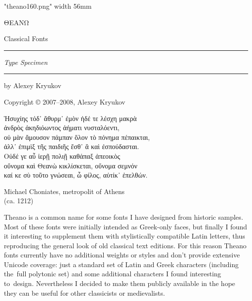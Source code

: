 \documentclass[12pt,a4paper,openany]{article}
\newcommand{\pageheader}[1]{%
	\clearpage
	\pagestyle{fancy}
	\lhead{\LARGE\bfseries#1}
	\cfoot{}
}
\begin{document}
\pagestyle{empty}
\mbox{}


\centerline{\XeTeXpicfile "theano160.png" width 56mm}


\centerline{\fontsize{48}{56}\selectfont ΘΕΑΝΩ}
\medskip

\centerline{\fontsize{48}{56}\selectfont Classical Fonts}

\bigskip

\rule{\textwidth}{0.5pt}

\bigskip

\centerline{\Large\itshape Type Specimen}

\bigskip

\rule{\textwidth}{0.5pt}


\centerline{\Large by Alexey Kryukov}


\centerline{Copyright © 2007--2008, Alexey Kryukov}

\pageheader{Theano Classical Fonts}

\epigraph{
Ἡσυχίης τόδ᾽ ἄθυρμ᾽ ἐμὸν ἠδέ τε λέσχη μακρὰ\\
ἀνδρὸς ἀκηδιόωντος ἀήματι νυσταλόεντι,\\
οὐ μὰν ἄμουσον πάμπαν ὅλον τὸ πόνημα πέπαικται,\\
ἀλλ᾽ ἐπιμὶξ τῆς παιδιῆς ἔσθ᾽ ἃ καὶ ἐσπούδασται.\\
Οὐδέ γε αὖ ἱερῇ πολιῇ καθάπαξ ἀπεοικὸς\\
οὔνομα καὶ Θεανὼ κικλίσκεται, οὔνομα σεμνόν\\
καί κε σὺ τοῦτο γνώσεαι, ὦ φίλος, αὐτίκ᾽ ἐπελθών.
}{Michael Choniates, metropolit of Athens\\ (ca. 1212)}

Theano is a common name for some fonts I have designed from historic
samples. Most of these fonts were initially intended as Greek-only
faces, but finally I found it interesting to supplement them with
stylistically compatible Latin letters, thus reproducing the general
look of old classical text editions. For this reason Theano fonts currently
have no additional weights or styles and don't provide extensive Unicode
coverage: just a standard set of Latin and Greek characters (including
the~full polytonic set) and some additional characters I found interesting
to~design. Nevertheless I decided to make them publicly available in the
hope they can be useful for other classicists or medievalists.
\end{document}
